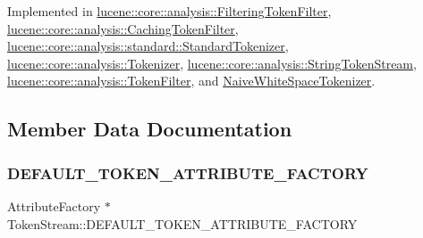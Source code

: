 Implemented in \mbox{\hyperlink{classlucene_1_1core_1_1analysis_1_1FilteringTokenFilter_ab85e4deab22d9dedd7ccb7b1f4750400}{lucene\+::core\+::analysis\+::\+Filtering\+Token\+Filter}}, \mbox{\hyperlink{classlucene_1_1core_1_1analysis_1_1CachingTokenFilter_adde877fb8c464d6eb2766bd400a1499c}{lucene\+::core\+::analysis\+::\+Caching\+Token\+Filter}}, \mbox{\hyperlink{classlucene_1_1core_1_1analysis_1_1standard_1_1StandardTokenizer_a4d6e42ca0fcaf07cb6615643362891b3}{lucene\+::core\+::analysis\+::standard\+::\+Standard\+Tokenizer}}, \mbox{\hyperlink{classlucene_1_1core_1_1analysis_1_1Tokenizer_a459d9c95a28f3b8aa3ad1cfde1568dd3}{lucene\+::core\+::analysis\+::\+Tokenizer}}, \mbox{\hyperlink{classlucene_1_1core_1_1analysis_1_1StringTokenStream_ab578e75921eb1757b4a8887cf29fe94d}{lucene\+::core\+::analysis\+::\+String\+Token\+Stream}}, \mbox{\hyperlink{classlucene_1_1core_1_1analysis_1_1TokenFilter_a0671ee825db7735a7b72b7a27a457ed9}{lucene\+::core\+::analysis\+::\+Token\+Filter}}, and \mbox{\hyperlink{classNaiveWhiteSpaceTokenizer_aa532e6a3e2fa6a9ebb90a4324179a30f}{Naive\+White\+Space\+Tokenizer}}.



\subsection{Member Data Documentation}
\mbox{\label{classlucene_1_1core_1_1analysis_1_1TokenStream_a3a38785c7907943994326cb9d7180671}} 
\subsubsection{\texorpdfstring{D\+E\+F\+A\+U\+L\+T\+\_\+\+T\+O\+K\+E\+N\+\_\+\+A\+T\+T\+R\+I\+B\+U\+T\+E\+\_\+\+F\+A\+C\+T\+O\+RY}{DEFAULT\_TOKEN\_ATTRIBUTE\_FACTORY}}
{\footnotesize\ttfamily Attribute\+Factory $\ast$ Token\+Stream\+::\+D\+E\+F\+A\+U\+L\+T\+\_\+\+T\+O\+K\+E\+N\+\_\+\+A\+T\+T\+R\+I\+B\+U\+T\+E\+\_\+\+F\+A\+C\+T\+O\+RY\hspace{0.3cm}{\ttfamily [static]}}

